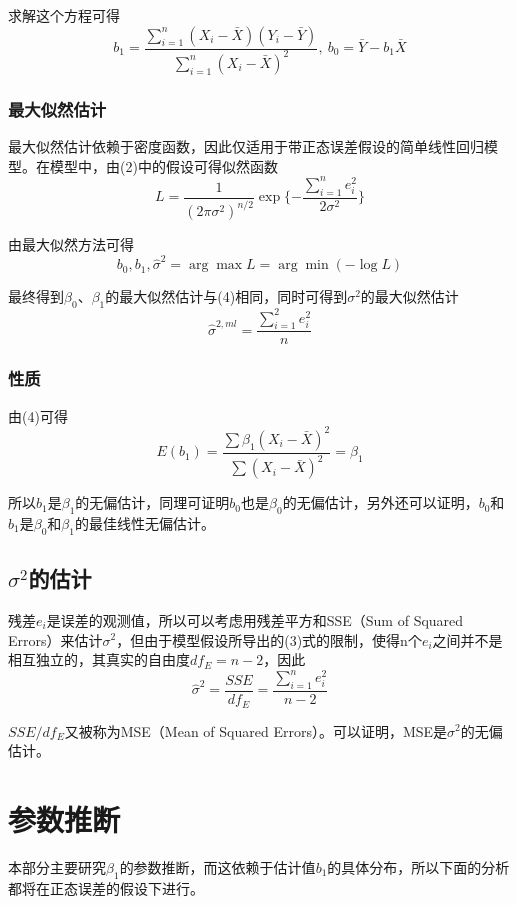 \documentclass[UTF8]{ctexart}
\begin{document}
求解这个方程可得
\begin{equation}
b_1=\frac{\sum_{i=1}^n(X_i-\bar{X})(Y_i-\bar{Y})}{\sum_{i=1}^n(X_i-\bar{X})^2},\ b_0=\bar{Y}-b_1\bar{X}
\end{equation}

\subsubsection{最大似然估计}
最大似然估计依赖于密度函数，因此仅适用于带正态误差假设的简单线性回归模型。在模型中，由(2)中的假设可得似然函数
$$L=\frac{1}{(2\pi\sigma^2)^{n/2}}\exp\{-\frac{\sum_{i=1}^ne_i^2}{2\sigma^2}\}$$

由最大似然方法可得
$$b_0,b_1,\hat{\sigma}^2=\arg\max L=\arg\min(-\log L)$$

最终得到$\beta_0$、$\beta_1$的最大似然估计与(4)相同，同时可得到$\sigma^2$的最大似然估计
$$\hat{\sigma}^{2,ml}=\frac{\sum_{i=1}^2e_i^2}{n}$$

\subsubsection{性质}
由(4)可得
\begin{equation}
    E(b_1)=\frac{\sum\beta_1(X_i-\bar{X})^2}{\sum(X_i-\bar{X})^2}=\beta_1
\end{equation}

所以$b_1$是$\beta_1$的无偏估计，同理可证明$b_0$也是$\beta_0$的无偏估计，另外还可以证明，$b_0$和$b_1$是$\beta_0$和$\beta_1$的最佳线性无偏估计。

\subsection{$\sigma^2$的估计}
残差$e_i$是误差的观测值，所以可以考虑用残差平方和SSE（Sum of Squared Errors）来估计$\sigma^2$，但由于模型假设所导出的(3)式的限制，使得n个$e_i$之间并不是相互独立的，其真实的自由度$df_E=n-2$，因此
\begin{equation}
    \hat{\sigma}^2=\frac{SSE}{df_E}=\frac{\sum_{i=1}^ne_i^2}{n-2}
\end{equation}

$SSE/df_E$又被称为MSE（Mean of Squared Errors）。可以证明，MSE是$\sigma^2$的无偏估计。

\section{参数推断}
本部分主要研究$\beta_1$的参数推断，而这依赖于估计值$b_1$的具体分布，所以下面的分析都将在正态误差的假设下进行。
\end{document}

